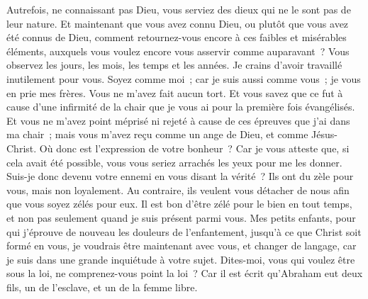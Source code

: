 \begin{multicols}{2}
Autrefois, ne connaissant pas Dieu, vous serviez des dieux qui ne le sont pas de leur nature.
Et maintenant que vous avez connu Dieu, ou plutôt que vous avez été connus de Dieu, comment retournez-vous encore à ces faibles et misérables éléments, auxquels vous voulez encore vous asservir comme auparavant~?
Vous observez les jours, les mois, les temps et les années.
Je crains d'avoir travaillé inutilement pour vous.
Soyez comme moi~; car je suis aussi comme vous~; je vous en prie mes frères.
Vous ne m'avez fait aucun tort. Et vous savez que ce fut à cause d'une infirmité de la chair que je vous ai pour la première fois évangélisés.
Et vous ne m'avez point méprisé ni rejeté à cause de ces épreuves que j'ai dans ma chair~; mais vous m'avez reçu comme un ange de Dieu, et comme Jésus-Christ.
Où donc est l'expression de votre bonheur~? Car je vous atteste que, si cela avait été possible, vous vous seriez arrachés les yeux pour me les donner.
Suis-je donc devenu votre ennemi en vous disant la vérité~?
Ils ont du zèle pour vous, mais non loyalement. Au contraire, ils veulent vous détacher de nous afin que vous soyez zélés pour eux.
Il est bon d'être zélé pour le bien en tout temps, et non pas seulement quand je suis présent parmi vous.
Mes petits enfants, pour qui j'éprouve de nouveau les douleurs de l'enfantement, jusqu'à ce que Christ soit formé en vous,
je voudrais être maintenant avec vous, et changer de langage, car je suis dans une grande inquiétude à votre sujet.
Dites-moi, vous qui voulez être sous la loi, ne comprenez-vous point la loi~?
Car il est écrit qu'Abraham eut deux fils, un de l'esclave, et un de la femme libre.

\end{multicols}
